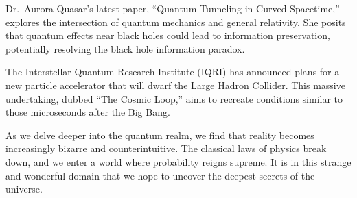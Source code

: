 Dr.~Aurora Quasar's latest paper, ``Quantum Tunneling in Curved
Spacetime,'' explores the intersection of quantum mechanics and general
relativity. She posits that quantum effects near black holes could lead
to information preservation, potentially resolving the black hole
information paradox.

The Interstellar Quantum Research Institute (IQRI) has announced plans
for a new particle accelerator that will dwarf the Large Hadron
Collider. This massive undertaking, dubbed ``The Cosmic Loop,'' aims to
recreate conditions similar to those microseconds after the Big Bang.

As we delve deeper into the quantum realm, we find that reality becomes
increasingly bizarre and counterintuitive. The classical laws of physics
break down, and we enter a world where probability reigns supreme. It is
in this strange and wonderful domain that we hope to uncover the deepest
secrets of the universe.
